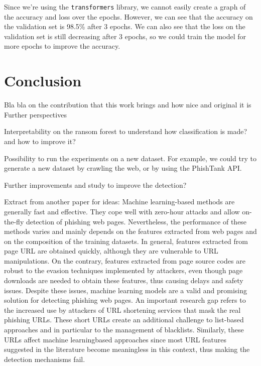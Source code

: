 \documentclass{article}
\begin{document}
    Since we're using the \texttt{transformers} library, we cannot easily create a graph of the accuracy and loss over the epochs. However, we can see that the accuracy on the validation set is 98.5\% after 3 epochs. We can also see that the loss on the validation set is still decreasing after 3 epochs, so we could train the model for more epochs to improve the accuracy.


    \section{Conclusion}\label{sec:conclusion}

    Bla bla on the contribution that this work brings and how nice and original it is
    Further perspectives

    Interpretability on the ransom forest to understand how classification is made? and how to improve it?

    Possibility to run the experiments on a new dataset.
    For example, we could try to generate a new dataset by crawling the web, or by using the PhishTank API.

    Further improvements and study to improve the detection?

    Extract from another paper for ideas:
    Machine learning-based methods are generally fast and
    effective. They cope well with zero-hour attacks and allow
    on-the-fly detection of phishing web pages. Nevertheless, the
    performance of these methods varies and mainly depends on
    the features extracted from web pages and on the composition
    of the training datasets. In general, features extracted from
    page URL are obtained quickly, although they are vulnerable
    to URL manipulations. On the contrary, features extracted
    from page source codes are robust to the evasion techniques
    implemented by attackers, even though page downloads are
    needed to obtain these features, thus causing delays and safety
    issues. Despite these issues, machine learning models are
    a valid and promising solution for detecting phishing web
    pages.
    An important research gap refers to the increased use by
    attackers of URL shortening services that mask the real phishing
    URLs. These short URLs create an additional challenge
    to list-based approaches and in particular to the management
    of blacklists. Similarly, these URLs affect machine learningbased
    approaches since most URL features suggested in the
    literature become meaningless in this context, thus making
    the detection mechanisms fail.
\end{document}
